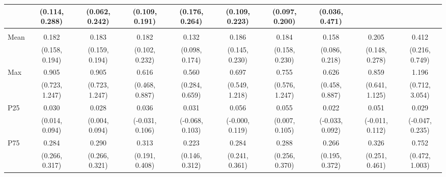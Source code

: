 {\begin{tabular}{l|c|c|c|c|c|c|c|c|c}
& {\scriptsize (0.114, 0.288)}
& {\scriptsize (0.062, 0.242)}
& {\scriptsize (0.109, 0.191)}
& {\scriptsize (0.176, 0.264)}
& {\scriptsize (0.109, 0.223)}
& {\scriptsize (0.097, 0.200)}
& {\scriptsize (0.036, 0.471)}
\\ [0.1cm]
\hline
\noalign{\smallskip}
\multicolumn{10}{l}{\textbf{Effect with Leads and Lags}} \\
\noalign{\smallskip}
\hline
Mean
& 0.182 & 0.183 & 0.182 & 0.132 & 0.186 & 0.184 & 0.158 & 0.205 & 0.412 \\
& {\scriptsize (0.158, 0.194)}
& {\scriptsize (0.159, 0.194)}
& {\scriptsize (0.102, 0.232)}
& {\scriptsize (0.098, 0.174)}
& {\scriptsize (0.145, 0.230)}
& {\scriptsize (0.158, 0.230)}
& {\scriptsize (0.086, 0.218)}
& {\scriptsize (0.148, 0.278)}
& {\scriptsize (0.216, 0.749)}
\\ [0.1cm]
\hline
Max
& 0.905 & 0.905 & 0.616 & 0.560 & 0.697 & 0.755 & 0.626 & 0.859 & 1.196 \\
& {\scriptsize (0.723, 1.247)}
& {\scriptsize (0.723, 1.247)}
& {\scriptsize (0.468, 0.887)}
& {\scriptsize (0.284, 0.659)}
& {\scriptsize (0.549, 1.218)}
& {\scriptsize (0.576, 1.247)}
& {\scriptsize (0.458, 0.887)}
& {\scriptsize (0.641, 1.125)}
& {\scriptsize (0.712, 3.054)}
\\ [0.1cm]
\hline
P25
& 0.030 & 0.028 & 0.036 & 0.031 & 0.056 & 0.055 & 0.022 & 0.051 & 0.029 \\
& {\scriptsize (0.014, 0.094)}
& {\scriptsize (0.004, 0.094)}
& {\scriptsize (-0.031, 0.106)}
& {\scriptsize (-0.068, 0.103)}
& {\scriptsize (-0.000, 0.119)}
& {\scriptsize (0.007, 0.105)}
& {\scriptsize (-0.033, 0.092)}
& {\scriptsize (-0.011, 0.112)}
& {\scriptsize (-0.047, 0.235)}
\\ [0.1cm]
\hline
P75
& 0.284 & 0.290 & 0.313 & 0.223 & 0.284 & 0.288 & 0.266 & 0.326 & 0.752 \\
& {\scriptsize (0.266, 0.317)}
& {\scriptsize (0.266, 0.321)}
& {\scriptsize (0.191, 0.408)}
& {\scriptsize (0.146, 0.312)}
& {\scriptsize (0.241, 0.361)}
& {\scriptsize (0.256, 0.370)}
& {\scriptsize (0.195, 0.372)}
& {\scriptsize (0.251, 0.461)}
& {\scriptsize (0.472, 1.003)}
\\ [0.1cm]
\hline
\hline
\end{tabular}
}
